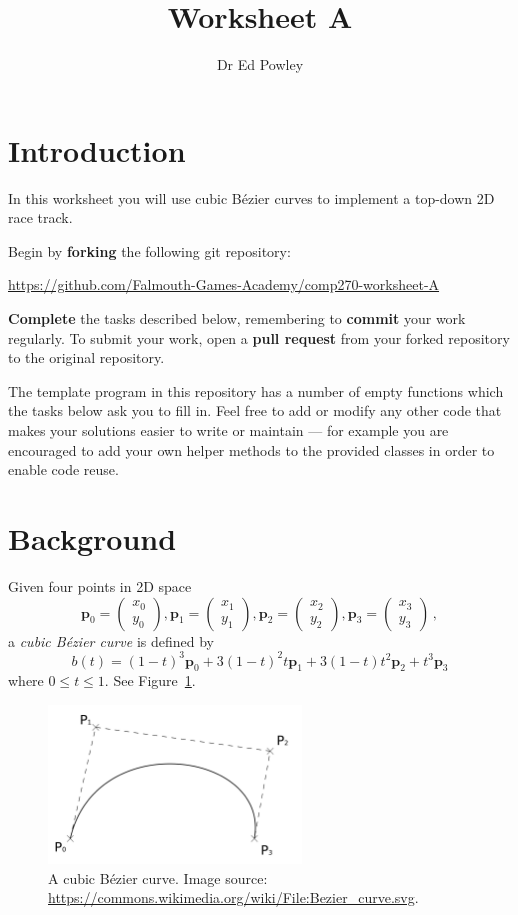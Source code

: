 \documentclass{../../../fal_assignment}
\title{Worksheet A}
\author{Dr Ed Powley}
\newcommand{\colvec}[2]{\begin{pmatrix}#1\\#2\end{pmatrix}}
\newcommand{\colxy}[1]{\colvec{x_{#1}}{y_{#1}}}
\begin{document}
\maketitle

\section*{Introduction}

In this worksheet you will use cubic B\'ezier curves to implement a top-down 2D race track.

Begin by \textbf{forking} the following git repository:

\begin{center}
	\url{https://github.com/Falmouth-Games-Academy/comp270-worksheet-A}
\end{center}

\textbf{Complete} the tasks described below, remembering to \textbf{commit} your work regularly.
To submit your work, open a \textbf{pull request} from your forked repository to the original repository.

The template program in this repository has a number of empty functions which the tasks below ask you to fill in. Feel free to add or modify any other code that makes your solutions easier to write or maintain ---
for example you are encouraged to add your own helper methods to the provided classes in order to enable code reuse.

\section*{Background}

Given four points in 2D space
$$ \mathbf{p}_0 = \colxy0, \mathbf{p}_1 = \colxy1, \mathbf{p}_2 = \colxy2, \mathbf{p}_3 = \colxy3 \,, $$
a \emph{cubic B\'ezier curve} is defined by
$$ b(t) = (1-t)^3 \mathbf{p}_0 + 3(1-t)^2t \mathbf{p}_1 + 3(1-t)t^2 \mathbf{p}_2 + t^3 \mathbf{p}_3 $$
where $0 \leq t \leq 1$. See Figure~\ref{fig:bezier}.

\begin{figure}[ht]
	\begin{center}
		\includegraphics[width=0.6\textwidth]{bezier}
	\end{center}
	\caption{A cubic B\'ezier curve. Image source: \protect\url{https://commons.wikimedia.org/wiki/File:Bezier_curve.svg}.}
	\label{fig:bezier}
\end{figure}
\end{document}

